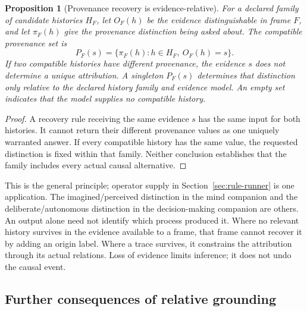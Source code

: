 \documentclass[11pt,a4paper]{article}
\newtheorem{proposition}[definition]{Proposition}
\theoremstyle{remark}\newtheorem{remark}[definition]{Remark}
\begin{document}
\begin{proposition}[Provenance recovery is evidence-relative]\label{prop:provenance-inference}
For a declared family of candidate histories \(H_F\), let \(O_F(h)\) be the
evidence distinguishable in frame \(F\), and let \(\pi_F(h)\) give the
provenance distinction being asked about. The compatible provenance set is
\[
P_F(s)=\{\pi_F(h):h\in H_F,\ O_F(h)=s\}.
\]
If two compatible histories have different provenance, the evidence \(s\)
does not determine a unique attribution. A singleton \(P_F(s)\) determines
that distinction only relative to the declared history family and evidence
model. An empty set indicates that the model supplies no compatible history.
\end{proposition}
\begin{proof}
A recovery rule receiving the same evidence \(s\) has the same input for
both histories. It cannot return their different provenance values as one
uniquely warranted answer. If every compatible history has the same value,
the requested distinction is fixed within that family. Neither conclusion
establishes that the family includes every actual causal alternative.
\end{proof}

This is the general principle; operator supply in
Section~\ref{sec:rule-runner} is one application. The imagined/perceived
distinction in the mind companion and the deliberate/autonomous distinction
in the decision-making companion are others. An output alone need not
identify which process produced it. Where no relevant history survives in
the evidence available to a frame, that frame cannot recover it by adding
an origin label. Where a trace survives, it constrains the attribution
through its actual relations. Loss of evidence limits inference; it does
not undo the causal event.

\subsection{Further consequences of relative grounding}
\end{document}

